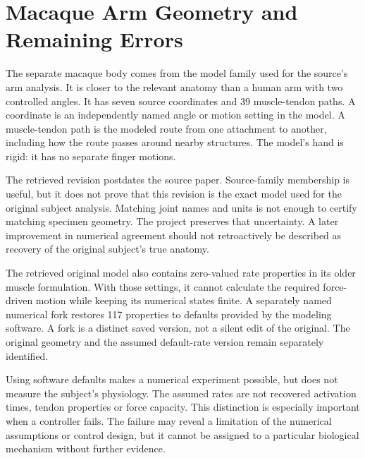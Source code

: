 \section{Macaque Arm Geometry and Remaining Errors}

The separate macaque body comes from the model family used for the source's arm analysis. It is closer to the relevant anatomy than a human arm with two controlled angles. It has seven source coordinates and 39 muscle-tendon paths. A coordinate is an independently named angle or motion setting in the model. A muscle-tendon path is the modeled route from one attachment to another, including how the route passes around nearby structures. The model's hand is rigid: it has no separate finger motions.\cite{chowdhury2020,limblabmodel2026}

The retrieved revision postdates the source paper. Source-family membership is useful, but it does not prove that this revision is the exact model used for the original subject analysis. Matching joint names and units is not enough to certify matching specimen geometry. The project preserves that uncertainty. A later improvement in numerical agreement should not retroactively be described as recovery of the original subject's true anatomy.

The retrieved original model also contains zero-valued rate properties in its older muscle formulation. With those settings, it cannot calculate the required force-driven motion while keeping its numerical states finite. A separately named numerical fork restores 117 properties to defaults provided by the modeling software. A fork is a distinct saved version, not a silent edit of the original. The original geometry and the assumed default-rate version remain separately identified.\cite{opensim2018}

Using software defaults makes a numerical experiment possible, but does not measure the subject's physiology. The assumed rates are not recovered activation times, tendon properties or force capacity. This distinction is especially important when a controller fails. The failure may reveal a limitation of the numerical assumptions or control design, but it cannot be assigned to a particular biological mechanism without further evidence.

